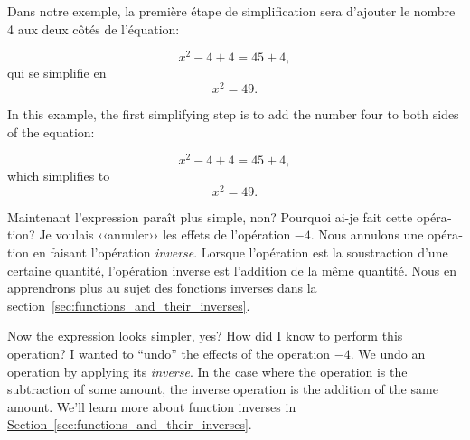 \begin{paracol}{2}

	\begin{leftcolumn*}

		\begin{otherlanguage}{french}
	Dans notre exemple,
	la première étape de simplification sera d'ajouter le nombre 4 aux deux côtés de l'équation:

	\[
	 	x^2-4  +4  		=	45    +4,
	\]
	qui se simplifie en
	\[
		x^2 	 		=	49.
	\]


		\end{otherlanguage}

	\end{leftcolumn*}



	\begin{rightcolumn}

	In this example,
	the first simplifying step is to add the number four to both sides of the equation:


	\[
	 	x^2-4  +4  		=	45    +4,
	\]
	which simplifies to
	\[
		x^2 	 		=	49.
	\]



	\end{rightcolumn}

\end{paracol}


\begin{paracol}{2}

	\begin{leftcolumn*}

		\begin{otherlanguage}{french}
	\noindent
	Maintenant l'expression paraît plus simple, non?
	Pourquoi ai-je fait cette opération? 
	Je voulais ‹‹annuler›› les effets de l'opération $-4$.
	Nous  annulons une opération en faisant l'opération \emph{inverse}.
	Lorsque l'opération est la soustraction d'une certaine quantité, l'opération inverse est l'addition de la même quantité.
	Nous en apprendrons plus au sujet des fonctions inverses dans la section~\ref{sec:functions_and_their_inverses}.


		\end{otherlanguage}

	\end{leftcolumn*}



	\begin{rightcolumn}

	Now the expression looks simpler, yes?
	How did I know to perform this operation? 
	I wanted to ``undo'' the effects of the operation $-4$.
	We undo an operation by applying its \emph{inverse}.
	In the case where the operation is the subtraction of some amount, the inverse operation is the addition of the same amount.
	We'll learn more about function inverses in 
	\hyperref[sec:functions_and_their_inverses]{Section~\ref{sec:functions_and_their_inverses}}. 



	\end{rightcolumn}

\end{paracol}

